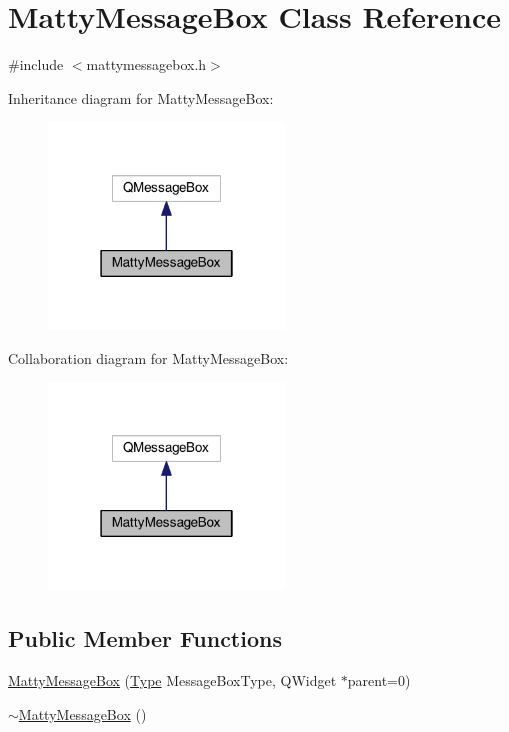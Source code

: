 \hypertarget{classMattyMessageBox}{}\section{Matty\+Message\+Box Class Reference}
\label{classMattyMessageBox}


{\ttfamily \#include $<$mattymessagebox.\+h$>$}



Inheritance diagram for Matty\+Message\+Box\+:
\nopagebreak
\begin{figure}[H]
\begin{center}
\leavevmode
\includegraphics[width=178pt]{classMattyMessageBox__inherit__graph}
\end{center}
\end{figure}


Collaboration diagram for Matty\+Message\+Box\+:
\nopagebreak
\begin{figure}[H]
\begin{center}
\leavevmode
\includegraphics[width=178pt]{classMattyMessageBox__coll__graph}
\end{center}
\end{figure}
\subsection*{Public Member Functions}
\begin{DoxyCompactItemize}
\item 
\hyperlink{classMattyMessageBox_a7690be6e7b2f25d397ce8c6a7cf067a4}{Matty\+Message\+Box} (\hyperlink{mattymessagebox_8h_a1d1cfd8ffb84e947f82999c682b666a7}{Type} Message\+Box\+Type, Q\+Widget $\ast$parent=0)
\item 
\hyperlink{classMattyMessageBox_ac33dcf18a7a03a04f27a893e4fff091a}{$\sim$\+Matty\+Message\+Box} ()
\end{DoxyCompactItemize}
